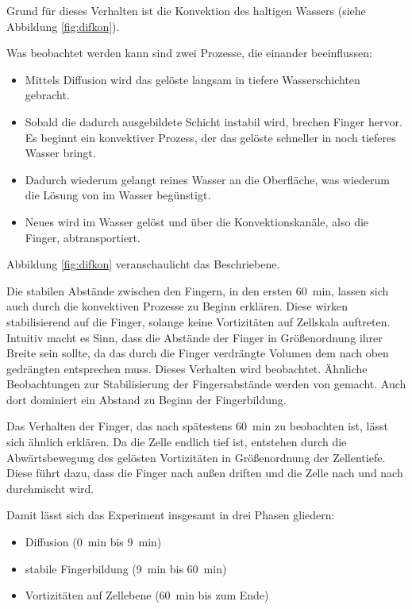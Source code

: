 Grund für dieses Verhalten ist die Konvektion des \COTm haltigen Wassers (siehe Abbildung \ref{fig:difkon}). 

Was beobachtet werden kann sind zwei Prozesse, die einander beeinflussen: 
\begin{itemize}
 \item Mittels Diffusion wird das gelöste \COT langsam in tiefere Wasserschichten gebracht.
 \item Sobald die dadurch ausgebildete Schicht instabil wird, brechen Finger hervor. Es beginnt ein konvektiver Prozess, der das gelöste \COT schneller in noch tieferes Wasser bringt.
 \item Dadurch wiederum gelangt reines Wasser an die Oberfläche, was wiederum die Lösung von \COT im Wasser begünstigt.
 \item Neues \COT wird im Wasser gelöst und über die Konvektionskanäle, also die Finger, abtransportiert.
\end{itemize}

Abbildung \ref{fig:difkon} veranschaulicht das Beschriebene.
 
Die stabilen Abstände zwischen den Fingern, in den ersten \SI{60}{\minute}, lassen sich auch durch die konvektiven Prozesse zu Beginn erklären. Diese wirken stabilisierend auf die Finger, solange keine Vortizitäten auf Zellskala auftreten.
Intuitiv macht es Sinn, dass die Abstände der Finger in Größenordnung ihrer Breite sein sollte, da das durch die Finger verdrängte Volumen dem nach oben gedrängten entsprechen muss. Dieses Verhalten wird beobachtet.
Ähnliche Beobachtungen zur Stabilisierung der Fingersabstände werden von \cite{fernandez} gemacht. Auch dort dominiert ein Abstand zu Beginn der Fingerbildung. 

Das Verhalten der Finger, das nach spätestens \SI{60}{\minute} zu beobachten ist, lässt sich ähnlich erklären. Da die Zelle endlich tief ist, entstehen durch die Abwärtsbewegung des gelösten \COT Vortizitäten in Größenordnung der Zellentiefe. Diese führt dazu, dass die Finger nach außen driften und die Zelle nach und nach durchmischt wird.

Damit lässt sich das Experiment insgesamt in drei Phasen gliedern:
\begin{itemize}
 \item Diffusion (\SI{0}{\minute} bis \SI{9}{\minute})
 \item stabile Fingerbildung (\SI{9}{\minute} bis \SI{60}{\minute})
 \item Vortizitäten auf Zellebene (\SI{60}{\minute} bis zum Ende) 
\end{itemize}


